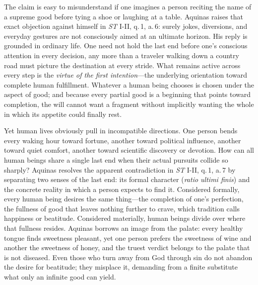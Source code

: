The claim is easy to misunderstand if one imagines a person reciting the name of a supreme good before tying a shoe or laughing at a table. Aquinas raises that exact objection against himself in \emph{ST} I-II, q.\,1, a.\,6: surely jokes, diversions, and everyday gestures are not consciously aimed at an ultimate horizon. His reply is grounded in ordinary life. One need not hold the last end before one's conscious attention in every decision, any more than a traveler walking down a country road must picture the destination at every stride. What remains active across every step is the \emph{virtue of the first intention}---the underlying orientation toward complete human fulfillment. Whatever a human being chooses is chosen under the aspect of good; and because every partial good is a beginning that points toward completion, the will cannot want a fragment without implicitly wanting the whole in which its appetite could finally rest.

Yet human lives obviously pull in incompatible directions. One person bends every waking hour toward fortune, another toward political influence, another toward quiet comfort, another toward scientific discovery or devotion. How can all human beings share a single last end when their actual pursuits collide so sharply? Aquinas resolves the apparent contradiction in \emph{ST} I-II, q.\,1, a.\,7 by separating two senses of the last end: its formal character (\emph{ratio ultimi finis}) and the concrete reality in which a person expects to find it. Considered formally, every human being desires the same thing---the completion of one's perfection, the fullness of good that leaves nothing further to crave, which tradition calls happiness or beatitude. Considered materially, human beings divide over where that fullness resides. Aquinas borrows an image from the palate: every healthy tongue finds sweetness pleasant, yet one person prefers the sweetness of wine and another the sweetness of honey, and the truest verdict belongs to the palate that is not diseased. Even those who turn away from God through sin do not abandon the desire for beatitude; they misplace it, demanding from a finite substitute what only an infinite good can yield.

